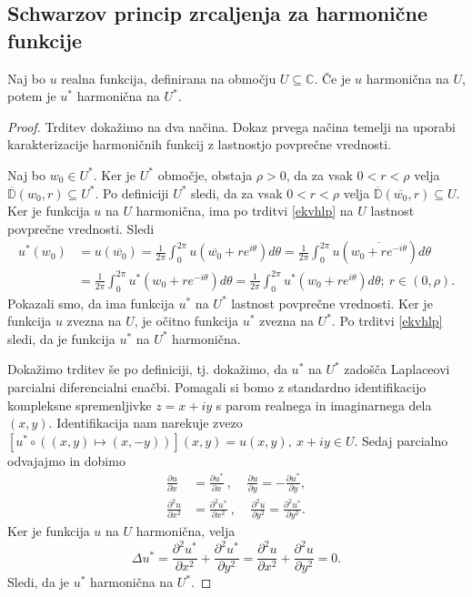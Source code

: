 \documentclass[mat1, tisk]{fmfdelo}
\begin{document}
\subsection{Schwarzov princip zrcaljenja za harmonične funkcije}
    \begin{trditev}
        \label{lemaharm}
        Naj bo $u$ realna funkcija, definirana na območju $U \subseteq \mathbb{C}$. Če je $u$ harmonična na $U$, potem je $u^*$ harmonična na $U^*$. 
    \end{trditev}
    \begin{proof}
        Trditev dokažimo na dva načina. Dokaz prvega načina temelji na uporabi karakterizacije harmoničnih funkcij z lastnostjo povprečne vrednosti. 
        
        Naj bo \mbox{$w_0 \in U^*$}. Ker je $U^*$ območje, obstaja $\rho>0$, da za vsak $0 < r < \rho$ velja $\overline{\mathbb{D}}(w_0, r) \subseteq U^*$. Po definiciji $U^*$ sledi, da za vsak \mbox{$0 < r < \rho$} velja $\overline{\mathbb{D}}(\overline{w_0}, r) \subseteq U$. 
        Ker je funkcija $u$ na $U$ harmonična, ima po trditvi \ref{ekvhlp} na $U$ lastnost povprečne vrednosti. Sledi
        \begin{align*}
            u^*(w_0) & = u(\overline{w_0}) = \frac{1}{2 \pi} \int_{0}^{2 \pi}{u\left(\overline{w_0} + r e^{i \theta}\right) d\theta} = \frac{1}{2 \pi} \int_{0}^{2 \pi}{u\left(\overline{w_0 + r e^{-i \theta}}\right) d\theta}\\
            &= \frac{1}{2 \pi} \int_{0}^{2 \pi}{u^*\left(w_0 + r e^{-i \theta}\right) d\theta} = \frac{1}{2 \pi} \int_{0}^{2 \pi}{u^*\left(w_0 + r e^{i \theta}\right) d\theta};~r \in (0, \rho).
        \end{align*} 
        Pokazali smo, da ima funkcija $u^*$ na $U^*$ lastnost povprečne vrednosti. 
        Ker je funkcija $u$ zvezna na $U$, je očitno funkcija $u^*$ zvezna na $U^*$. 
        Po trditvi \ref{ekvhlp} sledi, da je funkcija $u^*$ na $U^*$ harmonična. 
        
        Dokažimo trditev še po definiciji, tj. dokažimo, da $u^*$ na $U^*$ zadošča Laplaceovi parcialni diferencialni enačbi.
        Pomagali si bomo z standardno identifikacijo kompleksne spremenljivke $z = x + iy$ s parom realnega in imaginarnega dela $(x,y)$.
        Identifikacija nam narekuje zvezo $[u^* \circ ((x,y) \mapsto (x,-y))](x, y) = u(x, y),~ x + iy \in U$.
        Sedaj parcialno odvajajmo in dobimo
        \begin{align*}
            \frac{\partial u}{\partial x} &= \frac{\partial u^* }{\partial x}~,~~~~~\frac{\partial u}{\partial y} = - \frac{\partial u^* }{\partial y}, \\
            \frac{\partial^2 u}{\partial x^2} & = \frac{\partial^2 u^* }{\partial x^2}~,~~~~~\frac{\partial^2 u}{\partial y^2} = \frac{\partial^2 u^* }{\partial y^2}.
        \end{align*}
        Ker je funkcija $u$ na $U$ harmonična, velja
        $$
            \Delta u^* = \frac{\partial^2 u^*}{\partial x^2} + \frac{\partial^2 u^*}{\partial y^2} = \frac{\partial^2 u}{\partial x^2} + \frac{\partial^2 u}{\partial y^2} = 0.
        $$
        Sledi, da je $u^*$ harmonična na $U^*$.
    \end{proof}
\end{document}
